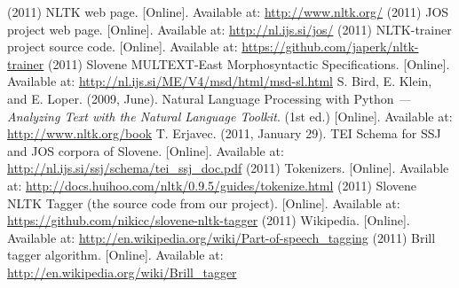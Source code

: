 \documentclass[10pt, conference, compsocconf]{IEEEtran}
\begin{document}
\begin{thebibliography}{99}
 (2011) NLTK web page. [Online]. Available at: \url{http://www.nltk.org/}
 (2011) JOS project web page. [Online]. Available at: \url{http://nl.ijs.si/jos/}
 (2011) NLTK-trainer project source code. [Online]. Available at: \url{https://github.com/japerk/nltk-trainer}
 (2011) Slovene MULTEXT-East Morphosyntactic Specifications. [Online]. Available at: \url{http://nl.ijs.si/ME/V4/msd/html/msd-sl.html}
 S. Bird, E. Klein, and E. Loper. (2009, June). Natural Language Processing with Python \textit{--- Analyzing Text with the Natural Language Toolkit}. (1st ed.) [Online]. Available at: \url{http://www.nltk.org/book}
 T. Erjavec. (2011, January 29). TEI Schema for SSJ and JOS corpora of Slovene. [Online].
Available at: \url{http://nl.ijs.si/ssj/schema/tei_ssj_doc.pdf}
 (2011) Tokenizers. [Online]. Available at: \url{http://docs.huihoo.com/nltk/0.9.5/guides/tokenize.html}
 (2011) Slovene NLTK Tagger (the source code from our project). [Online]. Available at: \url{https://github.com/nikicc/slovene-nltk-tagger}
 (2011) Wikipedia. [Online]. Available at: \url{http://en.wikipedia.org/wiki/Part-of-speech_tagging}
 (2011) Brill tagger algorithm. [Online]. Available at: \url{http://en.wikipedia.org/wiki/Brill_tagger}
\end{thebibliography}
\end{document}
